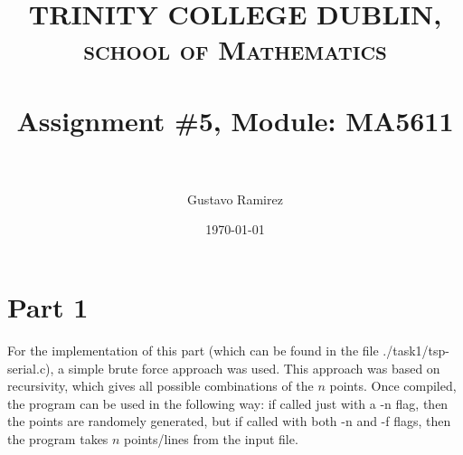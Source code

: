 \documentclass[paper=a4, fontsize=11pt]{scrartcl} %
\title{	
\normalfont \normalsize 
\textsc{TRINITY COLLEGE DUBLIN, school of Mathematics} \\ [25pt] %
\horrule{0.5pt} \\[0.4cm] %
\huge Assignment \#5, Module: MA5611 \\ %
\horrule{2pt} \\[0.5cm] %
}
\author{Gustavo Ramirez} %
\date{\normalsize\today} %
\numberwithin{equation}{section} %
\numberwithin{figure}{section} %
\numberwithin{table}{section} %
\begin{document}
\maketitle %


\begin{comment}
\section{Problem description}

\begin{enumerate}
\item 
\item 
\item 
\item 
\end{enumerate}

\end{comment}

\newpage


\begin{comment}

USEFUL LINKS:

official sources for terminology:
-----
http://www.intel.com/content/www/us/en/support/topics/glossary.html
https://www-01.ibm.com/software/globalization/terminology/a.html
-----




about IMB processors:
-----

insert in google: list of ibm processors
https://en.wikipedia.org/wiki/List_of_IBM_products
https://www-01.ibm.com/software/passportadvantage/guide_to_identifying_processor_family.html
http://www.nextplatform.com/2015/08/10/ibm-roadmap-extends-power-chips-to-2020-and-beyond/
http://www.theverge.com/2015/7/9/8919091/ibm-7nm-transistor-processor
https://www.ibm.com/developerworks/ibmi/library/i-ibmi-7_2-and-ibm-power8/
-----




\end{comment}


\section{Part 1}

For the implementation of this part (which can be found in the file ./task1/tsp-serial.c), a simple brute force approach was used. This approach was based on recursivity, which gives all possible combinations of the $n$ points. Once compiled, the program can be used in the following way: if called just with a -n flag, then the points are randomely generated, but if called with both -n and -f flags, then the program takes $n$ points/lines from the input file.
\end{document}
